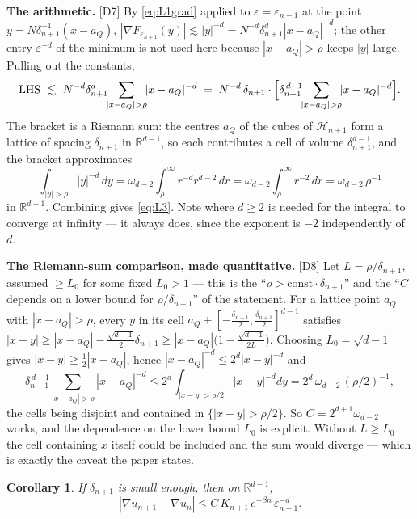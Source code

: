 \documentclass[11pt,reqno]{amsart}
\theoremstyle{plain}
\newtheorem*{corC}{Corollary}
\theoremstyle{definition}
\theoremstyle{plain}
\theoremstyle{definition}
\theoremstyle{remark}
\newcommand{\Rdm}{\mathbb{R}^{d-1}}
\newcommand{\Ledger}[1]{{\scriptsize\textsf{[#1]}}}
\begin{document}
\begin{expansion}
\textbf{The arithmetic.} \Ledger{D7} By \eqref{eq:L1grad} applied to
$\varepsilon=\varepsilon_{n+1}$ at the point $y=N\delta_{n+1}^{-1}(x-a_Q)$,
$|\nabla F_{\varepsilon_{n+1}}(y)|\lesssim|y|^{-d}
 =N^{-d}\delta_{n+1}^{d}|x-a_Q|^{-d}$; the other entry $\varepsilon^{-d}$ of the
minimum is not used here because $|x-a_Q|>\rho$ keeps $|y|$ large. Pulling out the
constants,
\[\text{LHS}\ \lesssim\ N^{-d}\delta_{n+1}^{d}\!\!\sum_{|x-a_Q|>\rho}\!\!|x-a_Q|^{-d}
 \;=\;N^{-d}\,\delta_{n+1}\cdot
 \Bigl[\delta_{n+1}^{\,d-1}\!\!\sum_{|x-a_Q|>\rho}\!\!|x-a_Q|^{-d}\Bigr].\]
The bracket is a Riemann sum: the centres $a_Q$ of the cubes of $\mathcal H_{n+1}$
form a lattice of spacing $\delta_{n+1}$ in $\Rdm$, so each contributes a cell of
volume $\delta_{n+1}^{d-1}$, and the bracket approximates
\[\int_{|y|>\rho}|y|^{-d}\,dy
 =\omega_{d-2}\int_\rho^\infty r^{-d}r^{d-2}\,dr
 =\omega_{d-2}\int_\rho^\infty r^{-2}\,dr=\omega_{d-2}\,\rho^{-1}\]
in $\Rdm$. Combining gives \eqref{eq:L3}. Note where $d\ge2$ is needed for the
integral to converge at infinity --- it always does, since the exponent is $-2$
independently of $d$.
\end{expansion}

\begin{filled}
\textbf{The Riemann-sum comparison, made quantitative.} \Ledger{D8} Let
$L=\rho/\delta_{n+1}$, assumed $\ge L_0$ for some fixed $L_0>1$ --- this is the
``$\rho>\mathrm{const}\cdot\delta_{n+1}$'' and the ``$C$ depends on a lower bound
for $\rho/\delta_{n+1}$'' of the statement. For a lattice point $a_Q$ with
$|x-a_Q|>\rho$, every $y$ in its cell $a_Q+[-\frac{\delta_{n+1}}2,
\frac{\delta_{n+1}}2]^{d-1}$ satisfies
$|x-y|\ge|x-a_Q|-\tfrac{\sqrt{d-1}}2\delta_{n+1}
 \ge|x-a_Q|\bigl(1-\tfrac{\sqrt{d-1}}{2L}\bigr)$.
Choosing $L_0=\sqrt{d-1}$ gives $|x-y|\ge\frac12|x-a_Q|$, hence
$|x-a_Q|^{-d}\le2^{d}|x-y|^{-d}$ and
\[\delta_{n+1}^{\,d-1}\!\!\sum_{|x-a_Q|>\rho}\!\!|x-a_Q|^{-d}
 \le2^{d}\!\!\int_{|x-y|>\rho/2}\!\!|x-y|^{-d}dy
 =2^{d}\,\omega_{d-2}\,(\rho/2)^{-1},\]
the cells being disjoint and contained in $\{|x-y|>\rho/2\}$. So
$C=2^{d+1}\omega_{d-2}$ works, and the dependence on the lower bound $L_0$ is
explicit. Without $L\ge L_0$ the cell containing $x$ itself could be included and
the sum would diverge --- which is exactly the caveat the paper states.
\end{filled}

\begin{corC}
If $\delta_{n+1}$ is small enough, then on $\Rdm$,
\begin{equation}\label{eq:cor}
 |\nabla u_{n+1}-\nabla u_n|\le C\,K_{n+1}\,e^{-\beta n}\,\varepsilon_{n+1}^{-d}.
\end{equation}
\end{corC}
\end{document}
